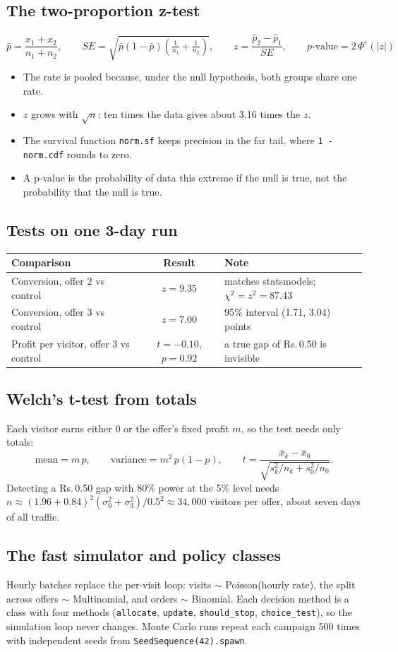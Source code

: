 \documentclass[11pt,a4paper]{article}
\newcommand{\Rs}{Rs.\,}
\newcommand{\jpart}[1]{\subsection*{#1}}
\newcommand{\code}[1]{\texttt{#1}}
\begin{document}
\jpart{The two-proportion z-test}
\[
\bar p = \frac{x_1+x_2}{n_1+n_2},\qquad
SE = \sqrt{\bar p(1-\bar p)\left(\tfrac1{n_1}+\tfrac1{n_2}\right)},\qquad
z = \frac{\hat p_2-\hat p_1}{SE},\qquad p\text{-value} = 2\,\Phi^{c}(|z|)
\]
\begin{itemize}
  \item The rate is pooled because, under the null hypothesis, both groups share one rate.
  \item $z$ grows with $\sqrt{n}$: ten times the data gives about 3.16 times the $z$.
  \item The survival function \code{norm.sf} keeps precision in the far tail, where \code{1 - norm.cdf}
        rounds to zero.
  \item A p-value is the probability of data this extreme if the null is true, not the probability that
        the null is true.
\end{itemize}

\jpart{Tests on one 3-day run}
\begin{center}
\small
\begin{tabular}{lcl}
\toprule
Comparison & Result & Note \\
\midrule
Conversion, offer 2 vs control & $z=9.35$ & matches statsmodels; $\chi^2=z^2=87.43$ \\
Conversion, offer 3 vs control & $z=7.00$ & 95\% interval (1.71, 3.04) points \\
Profit per visitor, offer 3 vs control & $t=-0.10$, $p=0.92$ & a true gap of \Rs 0.50 is invisible \\
\bottomrule
\end{tabular}
\end{center}

\jpart{Welch's t-test from totals}
Each visitor earns either 0 or the offer's fixed profit $m$, so the test needs only totals:
\[
\text{mean} = m\,p,\qquad \text{variance} = m^2\,p(1-p),\qquad
t = \frac{\bar x_k-\bar x_0}{\sqrt{s_k^2/n_k + s_0^2/n_0}}.
\]
Detecting a \Rs 0.50 gap with 80\% power at the 5\% level needs
$n \approx (1.96+0.84)^2(\sigma_0^2+\sigma_3^2)/0.5^2 \approx 34{,}000$ visitors per offer, about seven
days of all traffic.

\jpart{The fast simulator and policy classes}
Hourly batches replace the per-visit loop: visits $\sim$ Poisson(hourly rate), the split across offers
$\sim$ Multinomial, and orders $\sim$ Binomial. Each decision method is a class with four methods
(\code{allocate}, \code{update}, \code{should\_stop}, \code{choice\_test}), so the simulation loop never changes.
Monte Carlo runs repeat each campaign 500 times with independent seeds from \code{SeedSequence(42).spawn}.
\end{document}
